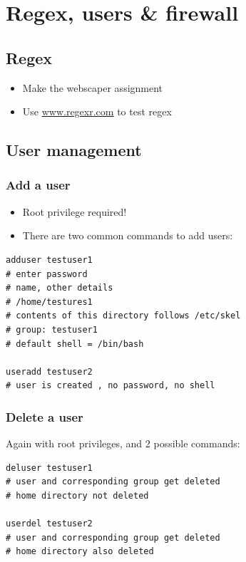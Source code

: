 \documentclass{article}
\begin{document}
\section{Regex, users \& firewall}

\subsection{Regex}

\begin{itemize}
    \item Make the webscaper assignment
    \item Use \url{www.regexr.com} to test regex
\end{itemize}

\subsection{User management}

\subsubsection{Add a user}

\begin{itemize}
    \item Root privilege required!
    \item There are two common commands to add users:
\end{itemize}

\begin{verbatim}
adduser testuser1
# enter password
# name, other details
# /home/testures1
# contents of this directory follows /etc/skel
# group: testuser1
# default shell = /bin/bash

useradd testuser2
# user is created , no password, no shell
\end{verbatim}

\subsubsection{Delete a user}

Again with root privileges, and 2 possible commands:

\begin{verbatim}
deluser testuser1
# user and corresponding group get deleted
# home directory not deleted

userdel testuser2
# user and corresponding group get deleted
# home directory also deleted
\end{verbatim}
\end{document}
